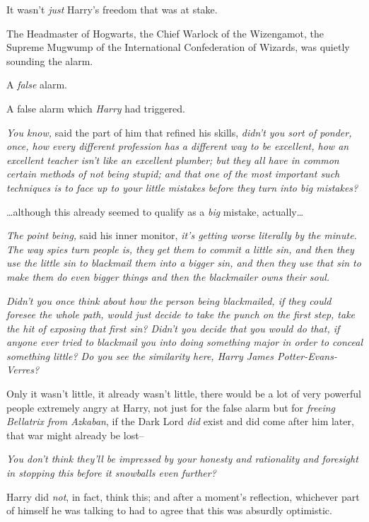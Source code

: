 It wasn't \emph{just} Harry's freedom that was at stake.

The Headmaster of Hogwarts, the Chief Warlock of the Wizengamot, the Supreme Mugwump of the International Confederation of Wizards, was quietly sounding the alarm.

A \emph{false} alarm.

A false alarm which \emph{Harry} had triggered.

\emph{You know,} said the part of him that refined his skills, \emph{didn't you sort of ponder, once, how every different profession has a different way to be excellent, how an excellent teacher isn't like an excellent plumber; but they all have in common certain methods of not being stupid; and that one of the most important such techniques is to face up to your little mistakes before they turn into \emph{big} mistakes?}

{\ldots}although this already seemed to qualify as a \emph{big} mistake, actually{\ldots}

\emph{The point being,} said his inner monitor, \emph{it's getting worse literally by the minute. The way spies turn people is, they get them to commit a little sin, and then they use the little sin to blackmail them into a bigger sin, and then they use \emph{that} sin to make them do even bigger things and then the blackmailer owns their soul.}

\emph{Didn't you once think about how the person being blackmailed, if they could foresee the whole path, would just decide to take the punch on the first step, take the hit of exposing that first sin? Didn't you decide that you would do that, if anyone ever tried to blackmail you into doing something major in order to conceal something little? Do you see the similarity here, Harry James Potter-Evans-Verres?}

Only it wasn't little, it already wasn't little, there would be a lot of very powerful people extremely angry at Harry, not just for the false alarm but for \emph{freeing Bellatrix from Azkaban}, if the Dark Lord \emph{did} exist and did come after him later, that war might already be lost\---

\emph{You don't think they'll be impressed by your honesty and rationality and foresight in stopping this before it snowballs even further?}

Harry did \emph{not}, in fact, think this; and after a moment's reflection, whichever part of himself he was talking to had to agree that this was absurdly optimistic.

